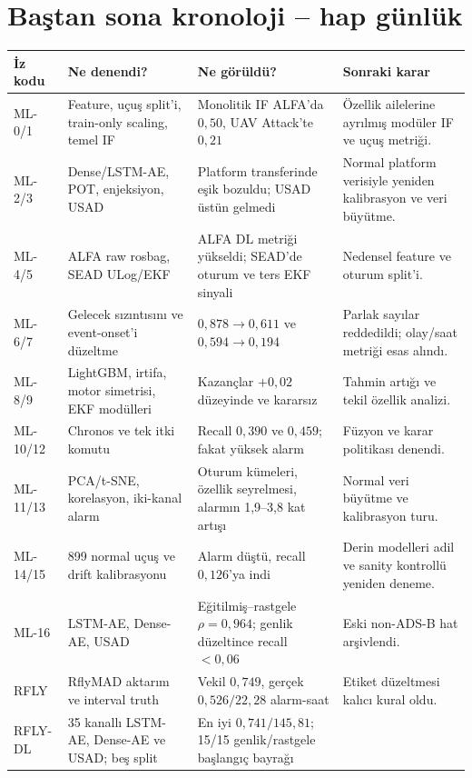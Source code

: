 \documentclass[10pt,a4paper]{article}
\begin{document}
\section{Baştan sona kronoloji -- hap günlük}

\begin{longtable}{p{}p{}p{}p{}}
\toprule
\textbf{İz kodu} & \textbf{Ne denendi?} & \textbf{Ne görüldü?} & \textbf{Sonraki karar} \\
\midrule
\endhead
ML-0/1 & Feature, uçuş split'i, train-only scaling, temel IF &
Monolitik IF ALFA'da $0{,}50$, UAV Attack'te $0{,}21$ &
Özellik ailelerine ayrılmış modüler IF ve uçuş metriği. \\
ML-2/3 & Dense/LSTM-AE, POT, enjeksiyon, USAD &
Platform transferinde eşik bozuldu; USAD üstün gelmedi &
Normal platform verisiyle yeniden kalibrasyon ve veri büyütme. \\
ML-4/5 & ALFA raw rosbag, SEAD ULog/EKF &
ALFA DL metriği yükseldi; SEAD'de oturum ve ters EKF sinyali &
Nedensel feature ve oturum split'i. \\
ML-6/7 & Gelecek sızıntısını ve event-onset'i düzeltme &
$0{,}878\rightarrow0{,}611$ ve $0{,}594\rightarrow0{,}194$ &
Parlak sayılar reddedildi; olay/saat metriği esas alındı. \\
ML-8/9 & LightGBM, irtifa, motor simetrisi, EKF modülleri &
Kazançlar $+0{,}02$ düzeyinde ve kararsız &
Tahmin artığı ve tekil özellik analizi. \\
ML-10/12 & Chronos ve tek itki komutu &
Recall $0{,}390$ ve $0{,}459$; fakat yüksek alarm &
Füzyon ve karar politikası denendi. \\
ML-11/13 & PCA/t-SNE, korelasyon, iki-kanal alarm &
Oturum kümeleri, özellik seyrelmesi, alarmın 1,9--3,8 kat artışı &
Normal veri büyütme ve kalibrasyon turu. \\
ML-14/15 & 899 normal uçuş ve drift kalibrasyonu &
Alarm düştü, recall $0{,}126$'ya indi &
Derin modelleri adil ve sanity kontrollü yeniden deneme. \\
ML-16 & LSTM-AE, Dense-AE, USAD &
Eğitilmiş--rastgele $\rho=0{,}964$; genlik düzeltince recall $<0{,}06$ &
Eski non-ADS-B hat arşivlendi. \\
RFLY & RflyMAD aktarım ve interval truth &
Vekil $0{,}749$, gerçek $0{,}526/22{,}28$ alarm-saat &
Etiket düzeltmesi kalıcı kural oldu. \\
RFLY-DL & 35 kanallı LSTM-AE, Dense-AE ve USAD; beş split &
En iyi $0{,}741/145{,}81$; 15/15 genlik/rastgele başlangıç bayrağı &

\end{longtable}
\end{document}
